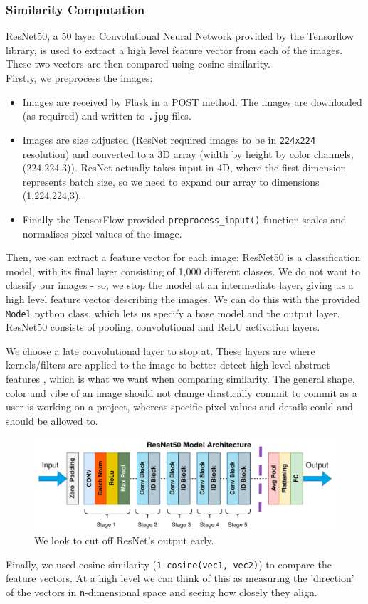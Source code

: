 \documentclass[12pt,a4paper]{article}
\begin{document}
\subsubsection{Similarity Computation} ResNet50, a 50 layer Convolutional Neural Network provided by the Tensorflow library, is used to extract a high level feature vector from each of the images. These two vectors are then compared using cosine similarity.\\

Firstly, we preprocess the images:
\begin{itemize}
    \item Images are received by Flask in a POST method. The images are downloaded (as required) and written to \verb|.jpg| files. 
    \item Images are size adjusted (ResNet required images to be in \verb|224x224| resolution) and converted to a 3D array (width by height by color channels, (224,224,3)). ResNet actually takes input in 4D, where the first dimension represents batch size, so we need to expand our array to dimensions (1,224,224,3).
    \item Finally the TensorFlow provided \verb|preprocess_input()| function scales and normalises pixel values of the image.
\end{itemize}
Then, we can extract a feature vector for each image: ResNet50 is a classification model, with its final layer consisting of 1,000 different classes. We do not want to classify our images - so, we stop the model at an intermediate layer, giving us a high level feature vector describing the images. We can do this with the provided \verb|Model| python class, which lets us specify a base model and the output layer. ResNet50 consists of pooling, convolutional and ReLU activation layers. 

We choose a late convolutional layer to stop at. These layers are where kernels/filters are applied to the image to better detect high level abstract features \cite{convNN}, which is what we want when comparing similarity. The general shape, color and vibe of an image should not change drastically commit to commit as a user is working on a project, whereas specific pixel values and details could and should be allowed to.
\begin{figure}[H]
    \centering
    \includegraphics[scale=0.8]{resnet.png}
    \caption{We look to cut off ResNet's output early.}
\end{figure}
Finally, we used cosine similarity (\verb|1-cosine(vec1, vec2)|) to compare the feature vectors. At a high level we can think of this as measuring the 'direction' of the vectors in \verb|n|-dimensional space and seeing how closely they align.
\end{document}
